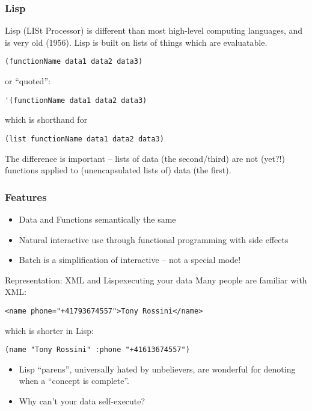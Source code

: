 \documentclass{beamer}
\begin{document}
\begin{frame}[fragile]
  \frametitle{Lisp}

  Lisp (LISt Processor) is different than most high-level computing
  languages, and is very old (1956).  Lisp is built on lists of things
  which are evaluatable.
\begin{verbatim}
(functionName data1 data2 data3)
\end{verbatim}
  or ``quoted'':
\begin{verbatim}
'(functionName data1 data2 data3)
\end{verbatim}
  which is shorthand for 
\begin{verbatim}
(list functionName data1 data2 data3)
\end{verbatim}
  The difference is important -- lists of data (the second/third) are
  not (yet?!) functions applied to (unencapsulated lists of) data (the first).
\end{frame}

\begin{frame}
  \frametitle{Features}
  \begin{itemize}
  \item Data and Functions semantically the same
  \item Natural interactive use through functional programming with
    side effects
  \item Batch is a simplification of interactive -- not a special mode!
  \end{itemize}
\end{frame}



\begin{frame}[fragile]{Representation: XML and Lisp}{executing your data}
  Many people are familiar with XML: 
\begin{verbatim}
<name phone="+41793674557">Tony Rossini</name>
\end{verbatim}
  which is shorter in Lisp:
\begin{verbatim}
(name "Tony Rossini" :phone "+41613674557")
\end{verbatim}
  \begin{itemize}
  \item Lisp ``parens'', universally hated by unbelievers, are
    wonderful for denoting when a ``concept is complete''.
  \item Why can't your data self-execute?
  \end{itemize}
\end{frame}
\end{document}
